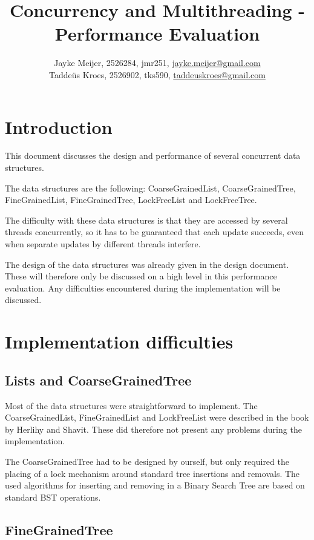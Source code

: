 \documentclass[a4paper]{article}
\title{Concurrency and Multithreading - Performance Evaluation}
\author{Jayke Meijer, 2526284, jmr251, \url{jayke.meijer@gmail.com} \\
Taddeüs Kroes, 2526902, tks590, \url{taddeuskroes@gmail.com}}
\begin{document}
\maketitle

\tableofcontents
\pagebreak

\section{Introduction}

This document discusses the design and performance of several
concurrent data structures.

The data structures are the following: CoarseGrainedList,
CoarseGrainedTree, FineGrainedList, FineGrainedTree,
LockFreeList and LockFreeTree.

The difficulty with these data structures is that they are accessed by several threads 
concurrently, so it has to be guaranteed that each update succeeds, even when separate
updates by different threads interfere.

The design of the data structures was already given in the design document\cite{design}. 
These will therefore only be discussed on a high level in this performance evaluation. Any
difficulties encountered during the implementation will be discussed.

\section{Implementation difficulties}

\subsection{Lists and CoarseGrainedTree}
Most of the data structures were straightforward to implement. The CoarseGrainedList,
FineGrainedList and LockFreeList were described in the book by Herlihy and 
Shavit\cite{book}. These did therefore not present any problems during the implementation.

The CoarseGrainedTree had to be designed by ourself, but only required the placing of a 
lock mechanism around standard tree insertions and removals. The used algorithms for 
inserting and removing in a Binary Search Tree are based on standard BST operations.
\cite{insert}\cite{delete}

\subsection{FineGrainedTree}
\end{document}
